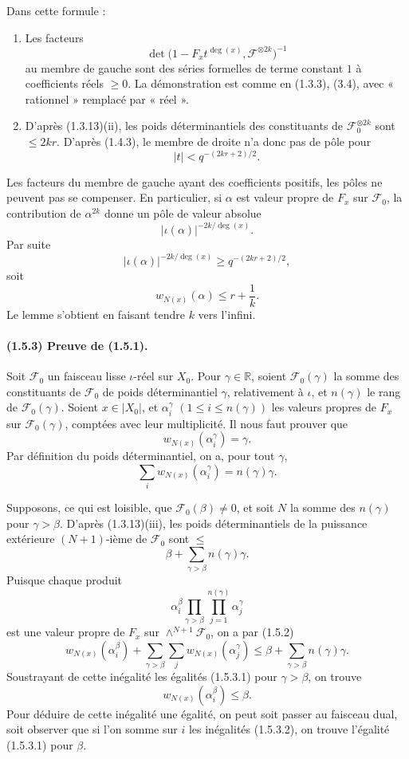 \documentclass[11pt]{article}
\theoremstyle{remark}
\begin{document}
Dans cette formule :
\begin{enumerate}[label=\alph*)]
\item Les facteurs
\[
\det\bigl(1-F_x t^{\deg(x)},\mathcal F^{\otimes 2k}\bigr)^{-1}
\]
au membre de gauche sont des séries formelles de terme constant $1$ à coefficients réels $\ge0$. La démonstration est comme en (1.3.3), (3.4), avec « rationnel » remplacé par « réel ».

\item D'après (1.3.13)(ii), les poids déterminantiels des constituants de $\mathcal F_0^{\otimes 2k}$ sont $\le 2kr$. D'après (1.4.3), le membre de droite n'a donc pas de pôle pour
\[
 |t|<q^{-(2kr+2)/2}.
\]
\end{enumerate}

Les facteurs du membre de gauche ayant des coefficients positifs, les pôles ne peuvent pas se compenser. En particulier, si $\alpha$ est valeur propre de $F_x$ sur $\mathcal F_0$, la contribution de $\alpha^{2k}$ donne un pôle de valeur absolue
\[
 |\iota(\alpha)|^{-2k/\deg(x)}.
\]
Par suite
\[
 |\iota(\alpha)|^{-2k/\deg(x)}
\ge q^{-(2kr+2)/2},
\]
soit
\[
w_{N(x)}(\alpha)\le r+\frac1k.
\]
Le lemme s'obtient en faisant tendre $k$ vers l'infini.

\paragraph{(1.5.3) Preuve de (1.5.1).} Soit $\mathcal F_0$ un faisceau lisse $\iota$-réel sur $X_0$. Pour $\gamma\in\mathbb R$, soient $\mathcal F_0(\gamma)$ la somme des constituants de $\mathcal F_0$ de poids déterminantiel $\gamma$, relativement à $\iota$, et $n(\gamma)$ le rang de $\mathcal F_0(\gamma)$. Soient $x\in |X_0|$, et $\alpha_i^\gamma$ $(1\le i\le n(\gamma))$ les valeurs propres de $F_x$ sur $\mathcal F_0(\gamma)$, comptées avec leur multiplicité. Il nous faut prouver que
\[
w_{N(x)}(\alpha_i^\gamma)=\gamma.
\]
Par définition du poids déterminantiel, on a, pour tout $\gamma$,
\begin{equation}\tag{1.5.3.1}
\sum_i w_{N(x)}(\alpha_i^\gamma)=n(\gamma)\gamma.
\end{equation}

Supposons, ce qui est loisible, que $\mathcal F_0(\beta)\ne0$, et soit $N$ la somme des $n(\gamma)$ pour $\gamma>\beta$. D'après (1.3.13)(iii), les poids déterminantiels de la puissance extérieure $(N+1)$-ième de $\mathcal F_0$ sont $\le$
\[
\beta+\sum_{\gamma>\beta}n(\gamma)\gamma.
\]
Puisque chaque produit
\[
\alpha_i^\beta\prod_{\gamma>\beta}\prod_{j=1}^{n(\gamma)}\alpha_j^\gamma
\]
est une valeur propre de $F_x$ sur $\wedge^{N+1}\mathcal F_0$, on a par (1.5.2)
\[
w_{N(x)}(\alpha_i^\beta)+\sum_{\gamma>\beta}\sum_j w_{N(x)}(\alpha_j^\gamma)
\le
\beta+\sum_{\gamma>\beta}n(\gamma)\gamma.
\]
Soustrayant de cette inégalité les égalités (1.5.3.1) pour $\gamma>\beta$, on trouve
\begin{equation}\tag{1.5.3.2}
w_{N(x)}(\alpha_i^\beta)\le \beta.
\end{equation}
Pour déduire de cette inégalité une égalité, on peut soit passer au faisceau dual, soit observer que si l'on somme sur $i$ les inégalités (1.5.3.2), on trouve l'égalité (1.5.3.1) pour $\beta$.
\end{document}
